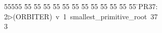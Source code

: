 %
%
\begin{tabbing}
55555 \= 55 \= 55 \= 55 \= 55 \= 55 \= 55 \= 55 \= 55 \= 55 \= 55 \= 55 \= 55 \= \>PR37:\\[0pt]
2\>$\triangleright$\>(ORBITER)\ v\ 1\ smallest\_primitive\_root\ 37\\[0pt]
3\>\end{tabbing}
